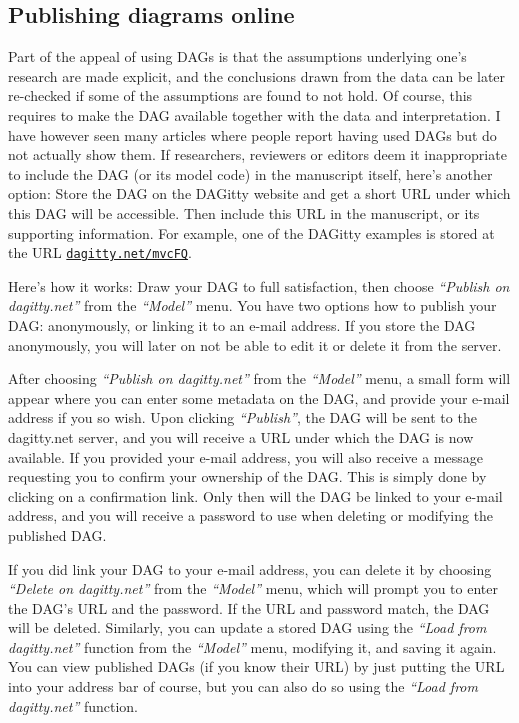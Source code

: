 \documentclass[a4paper]{article} %
\newcommand{\pp}{DAGitty\xspace}
\newcommand{\action}[1]{\emph{``#1''}}
\begin{document}
\subsection{Publishing diagrams online}

Part of the appeal of using DAGs is that the assumptions underlying
one's research are made explicit, and the conclusions drawn from 
the data can be later re-checked if some of the assumptions are found
to not hold. Of course, this requires to make the DAG available together
with the data and interpretation. I have however seen many articles
where people report having used DAGs but do not actually show them.
If researchers, reviewers or editors deem it inappropriate to include the 
DAG (or its model code) in the manuscript itself, here's another option:
Store the DAG on the \pp website and get a short URL under which
this DAG will be accessible. Then include this URL in the manuscript,
or its supporting information. For example, one of the \pp examples
is stored at the URL \href{https://dagitty.net/mvcFQ}{\tt dagitty.net/mvcFQ}.

Here's how it works: Draw your DAG to full satisfaction, then choose 
\action{Publish on dagitty.net} from the \action{Model} menu. You have
two options how to publish your DAG: anonymously, or linking it to an e-mail
address. If you store the DAG anonymously, you will later on not be able
to edit it or delete it from the server.

After choosing \action{Publish on dagitty.net} from the \action{Model} menu,
a small form will appear where you can enter some metadata on the DAG,
and provide your e-mail address if you so wish. Upon clicking \action{Publish},
the DAG will be sent to the dagitty.net server, and you will receive a URL under
which the DAG is now available. If you provided your e-mail address, you
will also receive a message requesting you to confirm your ownership of the DAG.
This is simply done by clicking on a confirmation link. Only then will the DAG
be linked to your e-mail address, and you will receive a password to use when
deleting or modifying the published DAG.

If you did link your DAG to your e-mail address, you can delete it by choosing
\action{Delete on dagitty.net} from the \action{Model} menu, which will prompt you
to enter the DAG's URL and the password. If the URL and password match,
the DAG will be deleted.
Similarly, you can update a stored DAG using the \action{Load from dagitty.net} function
from the  \action{Model} menu, modifying it, and saving it again. 
You can view published DAGs (if you know their URL)
by just putting the URL into your address bar of course, but you can also do
so using the \action{Load from dagitty.net} function. 
\end{document}
